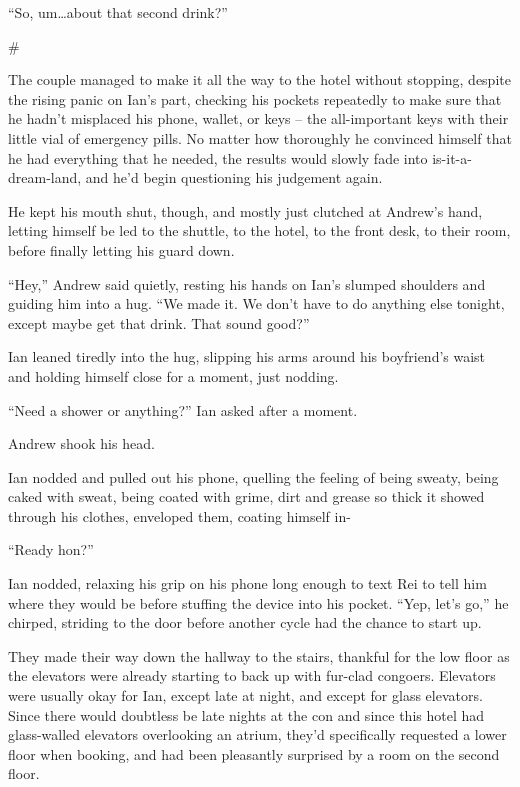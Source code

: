 \documentclass[12pt,letterpaper,oneside]{memoir}
\newcommand\secdiv{
  \begin{center}
    \#
  \end{center}
}
\begin{document}
  ``So, um\ldots{}about that second drink?''

  \secdiv

  The couple managed to make it all the way to the hotel without stopping, despite the rising panic on Ian's part, checking his pockets repeatedly to make sure that he hadn't misplaced his phone, wallet, or keys -- the all-important keys with their little vial of emergency pills. No matter how thoroughly he convinced himself that he had everything that he needed, the results would slowly fade into is-it-a-dream-land, and he'd begin questioning his judgement again.

  He kept his mouth shut, though, and mostly just clutched at Andrew's hand, letting himself be led to the shuttle, to the hotel, to the front desk, to their room, before finally letting his guard down.

  ``Hey,'' Andrew said quietly, resting his hands on Ian's slumped shoulders and guiding him into a hug. ``We made it. We don't have to do anything else tonight, except maybe get that drink. That sound good?''

  Ian leaned tiredly into the hug, slipping his arms around his boyfriend's waist and holding himself close for a moment, just nodding.

  ``Need a shower or anything?'' Ian asked after a moment.

  Andrew shook his head.

  Ian nodded and pulled out his phone, quelling the feeling of being sweaty, being caked with sweat, being coated with grime, dirt and grease so thick it showed through his clothes, enveloped them, coating himself in-

  ``Ready hon?''

  Ian nodded, relaxing his grip on his phone long enough to text Rei to tell him where they would be before stuffing the device into his pocket. ``Yep, let's go,'' he chirped, striding to the door before another cycle had the chance to start up.

  They made their way down the hallway to the stairs, thankful for the low floor as the elevators were already starting to back up with fur-clad congoers. Elevators were usually okay for Ian, except late at night, and except for glass elevators. Since there would doubtless be late nights at the con and since this hotel had glass-walled elevators overlooking an atrium, they'd specifically requested a lower floor when booking, and had been pleasantly surprised by a room on the second floor.
\end{document}
